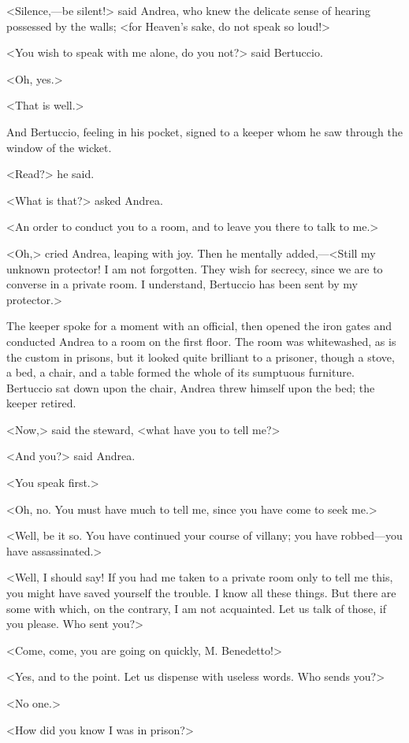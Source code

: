  <Silence,—be silent!> said Andrea, who knew the delicate sense of hearing possessed by the walls; <for Heaven's sake, do not speak so loud!> 

 <You wish to speak with me alone, do you not?> said Bertuccio. 

 <Oh, yes.> 

 <That is well.> 

 And Bertuccio, feeling in his pocket, signed to a keeper whom he saw through the window of the wicket. 

 <Read?> he said. 

 <What is that?> asked Andrea. 

 <An order to conduct you to a room, and to leave you there to talk to me.> 

 <Oh,> cried Andrea, leaping with joy. Then he mentally added,—<Still my unknown protector! I am not forgotten. They wish for secrecy, since we are to converse in a private room. I understand, Bertuccio has been sent by my protector.> 

 The keeper spoke for a moment with an official, then opened the iron gates and conducted Andrea to a room on the first floor. The room was whitewashed, as is the custom in prisons, but it looked quite brilliant to a prisoner, though a stove, a bed, a chair, and a table formed the whole of its sumptuous furniture. Bertuccio sat down upon the chair, Andrea threw himself upon the bed; the keeper retired. 

 <Now,> said the steward, <what have you to tell me?> 

 <And you?> said Andrea. 

 <You speak first.> 

 <Oh, no. You must have much to tell me, since you have come to seek me.>  
 
 <Well, be it so. You have continued your course of villany; you have robbed—you have assassinated.> 

 <Well, I should say! If you had me taken to a private room only to tell me this, you might have saved yourself the trouble. I know all these things. But there are some with which, on the contrary, I am not acquainted. Let us talk of those, if you please. Who sent you?> 

 <Come, come, you are going on quickly, M. Benedetto!> 

 <Yes, and to the point. Let us dispense with useless words. Who sends you?> 

 <No one.> 

 <How did you know I was in prison?> 

